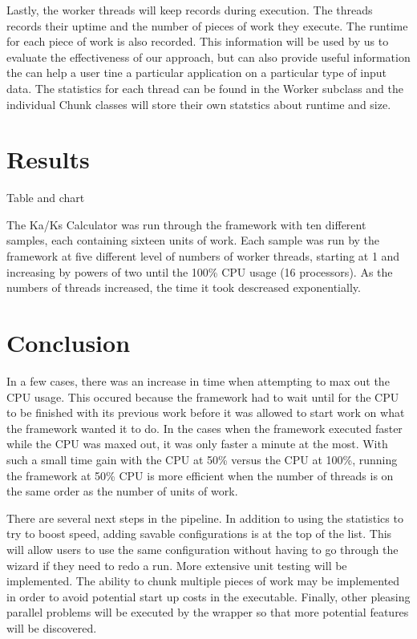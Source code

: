 \documentclass[12pt]{article}
\begin{document}
Lastly, the worker threads will keep records during execution. The threads 
records their uptime and the number of pieces of work they execute. The runtime 
for each piece of work is also recorded. This information will be used by us to
evaluate the effectiveness of our approach, but can also provide useful
information the can help a user tine a particular application on a particular
type of input data. The statistics for each thread can be found in the Worker 
subclass and the individual Chunk classes will store their own statstics about 
runtime and size.

\section{Results}

Table and chart

The Ka/Ks Calculator was run through the framework with ten different samples,
each containing sixteen units of work. Each sample was run by the framework at 
five different level of numbers of worker threads, starting at 1 and 
increasing by powers of two until the 100\% CPU usage (16 processors). As the 
numbers of threads increased, the time it took descreased exponentially. 

\section{Conclusion}

In a few cases, there was an increase in time when attempting to max out the CPU 
usage. This occured because the framework had to wait until for the CPU to be 
finished with its previous work before it was allowed to start work on what the 
framework wanted it to do. In the cases when the framework executed faster while
the CPU was maxed out, it was only faster a minute at the most. With such a
small time gain with the CPU at 50\% versus the CPU at 100\%, running the
framework at 50\% CPU is more efficient when the number of threads is on the
same order as the number of units of work.

There are several next steps in the pipeline. In addition to using the
statistics to try to boost speed, adding savable configurations is at the top of
the list. This will allow users to use the same configuration without having to
go through the wizard if they need to redo a run. More extensive unit testing
will be implemented. The ability to chunk multiple pieces of work may be
implemented in order to avoid potential start up costs in the executable. 
Finally, other pleasing parallel problems will be executed by the wrapper so 
that more potential features will be discovered. 
\end{document}
